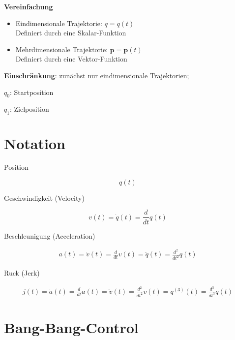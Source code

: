 {{\textbf{Vereinfachung}

  \begin{itemize}
    \item Eindimensionale Trajektorie: $q=q(t)$
          \\Definiert durch eine Skalar-Funktion
    \item Mehrdimensionale Trajektorie: $\textbf{p}=\textbf{p}(t)$
          \\Definiert durch eine Vektor-Funktion
  \end{itemize}

  \textbf{Einschränkung}: zunächst nur eindimensionale Trajektorien; \cite{Piegl:1997}
}

{ 

  $q_0$: Startposition

  $q_1$: Zielposition

  \begin{figure}[!h]
    \centering
    
  \end{figure}
}

\section{Notation}
{ 


  Position

  \begin{equation}
    q(t)
  \end{equation}

  Geschwindigkeit (Velocity)

  \begin{equation}
    v(t) 
    = \dot{q}(t) 
    = \frac{d}{dt} q(t)
  \end{equation}

  Beschleunigung (Acceleration)

  \begin{eqnarray}
    a(t) 
    = \dot{v}(t) = \frac{d}{dt} v(t) 
    = \ddot{q}(t) = \frac{d^2}{dt^2} q(t)
  \end{eqnarray}

  Ruck (Jerk)

  \begin{eqnarray}
    j(t) 
    = \dot{a}(t) = \frac{d}{dt} a(t)
    = \ddot{v}(t) = \frac{d^2}{dt^2} v(t)
    = q^{(3)}(t) = \frac{d^3}{dt^3} q(t)
  \end{eqnarray}
}


\section{Bang-Bang-Control}

}
